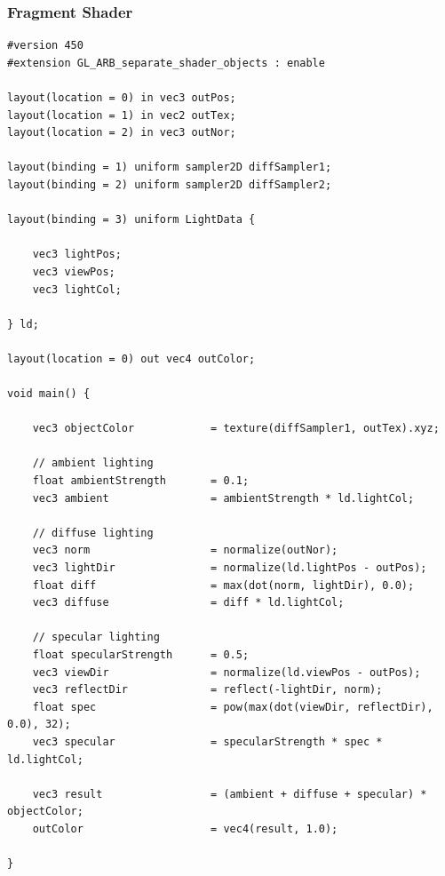 \documentclass[titlepage, 11pt, a4paper, ngerman]{article}
\begin{document}
\subsubsection{Fragment Shader}
\begin{verbatim}
#version 450
#extension GL_ARB_separate_shader_objects : enable

layout(location = 0) in vec3 outPos;
layout(location = 1) in vec2 outTex;
layout(location = 2) in vec3 outNor;

layout(binding = 1) uniform sampler2D diffSampler1;
layout(binding = 2) uniform sampler2D diffSampler2;

layout(binding = 3) uniform LightData {

    vec3 lightPos;
    vec3 viewPos;
    vec3 lightCol;

} ld;

layout(location = 0) out vec4 outColor;

void main() {

    vec3 objectColor            = texture(diffSampler1, outTex).xyz;

    // ambient lighting
    float ambientStrength       = 0.1;
    vec3 ambient                = ambientStrength * ld.lightCol;
  	
    // diffuse lighting
    vec3 norm                   = normalize(outNor);
    vec3 lightDir               = normalize(ld.lightPos - outPos);
    float diff                  = max(dot(norm, lightDir), 0.0);
    vec3 diffuse                = diff * ld.lightCol;
    
    // specular lighting
    float specularStrength      = 0.5;
    vec3 viewDir                = normalize(ld.viewPos - outPos);
    vec3 reflectDir             = reflect(-lightDir, norm);  
    float spec                  = pow(max(dot(viewDir, reflectDir), 0.0), 32);
    vec3 specular               = specularStrength * spec * ld.lightCol;  
        
    vec3 result                 = (ambient + diffuse + specular) * objectColor;
    outColor                    = vec4(result, 1.0);

}
\end{verbatim}

\newpage
\end{document}
